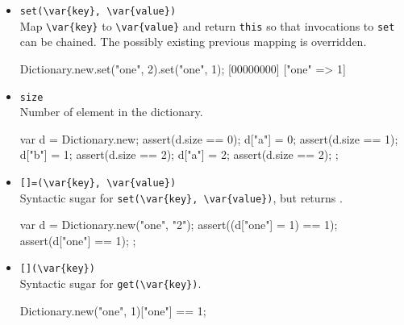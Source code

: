 \begin{itemize}
\item \lstinline|set(\var{key}, \var{value})|\\
  Map \lstinline|\var{key}| to \lstinline|\var{value}| and return
  \lstinline|this| so that invocations to \lstinline|set| can be
  chained.  The possibly existing previous mapping is overridden.

\begin{urbiscript}
Dictionary.new.set("one", 2).set("one", 1);
[00000000] ["one" => 1]
\end{urbiscript}

\item \lstinline|size|\\
  Number of element in the dictionary.

\begin{urbiscript}
{
  var d = Dictionary.new;
  assert(d.size == 0);
  d["a"] = 0;
  assert(d.size == 1);
  d["b"] = 1;
  assert(d.size == 2);
  d["a"] = 2;
  assert(d.size == 2);
};
\end{urbiscript}

\item \lstinline|[]=(\var{key}, \var{value})|\\
  Syntactic sugar for \lstinline|set(\var{key}, \var{value})|, but
  returns .

\begin{urbiscript}
{
  var d = Dictionary.new("one", "2");
  assert((d["one"] = 1) == 1);
  assert(d["one"] == 1);
};
\end{urbiscript}

\item \lstinline|[](\var{key})|\\
  Syntactic sugar for \lstinline|get(\var{key})|.

\begin{urbiassert}
Dictionary.new("one", 1)["one"] == 1;
\end{urbiassert}

\end{itemize}


